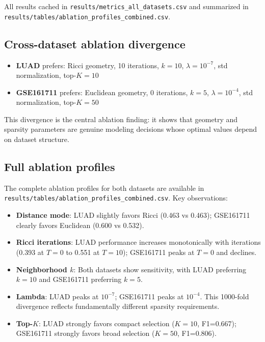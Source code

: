 \documentclass[11pt]{article}
\begin{document}
All results cached in \texttt{results/metrics\_all\_datasets.csv} and summarized in \texttt{results/tables/ablation\_profiles\_combined.csv}.

\subsection{Cross-dataset ablation divergence}

\begin{itemize}[leftmargin=1.5em]
\item \textbf{LUAD} prefers: Ricci geometry, 10 iterations, $k=10$, $\lambda=10^{-7}$, std normalization, top-$K=10$
\item \textbf{GSE161711} prefers: Euclidean geometry, 0 iterations, $k=5$, $\lambda=10^{-4}$, std normalization, top-$K=50$
\end{itemize}

This divergence is the central ablation finding: it shows that geometry and sparsity parameters are genuine modeling decisions whose optimal values depend on dataset structure.

\subsection{Full ablation profiles}

The complete ablation profiles for both datasets are available in \texttt{results/tables/ablation\_profiles\_combined.csv}.
Key observations:
\begin{itemize}[leftmargin=1.5em]
\item \textbf{Distance mode}: LUAD slightly favors Ricci (0.463 vs 0.463); GSE161711 clearly favors Euclidean (0.600 vs 0.532).
\item \textbf{Ricci iterations}: LUAD performance increases monotonically with iterations (0.393 at $T=0$ to 0.551 at $T=10$); GSE161711 peaks at $T=0$ and declines.
\item \textbf{Neighborhood $k$}: Both datasets show sensitivity, with LUAD preferring $k=10$ and GSE161711 preferring $k=5$.
\item \textbf{Lambda}: LUAD peaks at $10^{-7}$; GSE161711 peaks at $10^{-4}$. This 1000-fold divergence reflects fundamentally different sparsity requirements.
\item \textbf{Top-$K$}: LUAD strongly favors compact selection ($K=10$, F1=0.667); GSE161711 strongly favors broad selection ($K=50$, F1=0.806).
\end{itemize}
\end{document}

